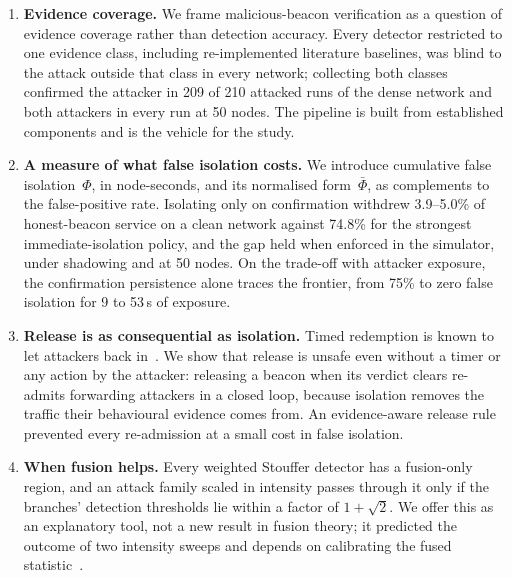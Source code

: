\begin{enumerate}
\item \textbf{Evidence coverage.} We frame malicious-beacon verification as a
      question of evidence coverage rather than detection accuracy. Every
      detector restricted to one evidence class, including re-implemented
      literature baselines, was blind to the attack outside that class in
      every network; collecting both classes confirmed the attacker in 209 of
      210 attacked runs of the dense network and both attackers in every run
      at 50 nodes. The pipeline is built from established components and is
      the vehicle for the study.

\item \textbf{A measure of what false isolation costs.} We introduce
      cumulative false isolation~$\Phi$, in node-seconds, and its normalised
      form~$\bar\Phi$, as complements to the false-positive rate. Isolating
      only on confirmation withdrew 3.9--5.0\% of honest-beacon service on a
      clean network against 74.8\% for the strongest immediate-isolation
      policy, and the gap held when enforced in the simulator, under
      shadowing and at 50 nodes. On the trade-off with attacker exposure, the
      confirmation persistence alone traces the frontier, from 75\% to zero
      false isolation for 9 to 53\,s of exposure.

\item \textbf{Release is as consequential as isolation.} Timed redemption is
      known to let attackers back in~\cite{bansal2003ocean,sen2010survey}. We
      show that release is unsafe even without a timer or any action by the
      attacker: releasing a beacon when its verdict clears re-admits
      forwarding attackers in a closed loop, because isolation removes the
      traffic their behavioural evidence comes from. An evidence-aware release
      rule prevented every re-admission at a small cost in false isolation.

\item \textbf{When fusion helps.} Every weighted Stouffer detector has a
      fusion-only region, and an attack family scaled in intensity passes
      through it only if the branches' detection thresholds lie within a
      factor of $1+\sqrt{2}$. We offer this as an explanatory tool, not a new
      result in fusion theory; it predicted the outcome of two intensity
      sweeps and depends on calibrating the fused
      statistic~\cite{stouffer1949,whitlock2005weighted}.


\end{enumerate}
